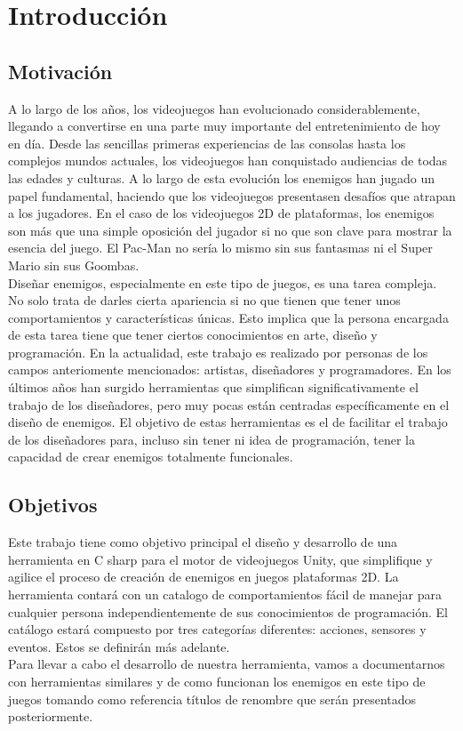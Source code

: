 \chapter{Introducción}
\label{cap:introduccion}


\section{Motivación}
A lo largo de los años, los videojuegos han evolucionado considerablemente, llegando a convertirse en una parte muy importante del entretenimiento de hoy en día. Desde las sencillas primeras experiencias de las consolas hasta los complejos mundos actuales, los videojuegos han conquistado audiencias de todas las edades y culturas. A lo largo de esta evolución los enemigos han jugado un papel fundamental, haciendo que los videojuegos presentasen desafíos que atrapan a los jugadores. 
En el caso de los videojuegos 2D de plataformas, los enemigos son más que una simple oposición del jugador si no que son clave para mostrar la esencia del juego. El Pac-Man no sería lo mismo sin sus fantasmas ni el Super Mario sin sus Goombas. \\
Diseñar enemigos, especialmente en este tipo de juegos, es una tarea compleja. No solo trata de darles cierta apariencia si no que tienen que tener unos comportamientos y características únicas.  Esto implica que la persona encargada de esta tarea tiene que tener ciertos conocimientos en arte, diseño y programación. En la actualidad, este trabajo es realizado por personas de los campos anteriomente mencionados: artistas, diseñadores y programadores.
En los últimos años han surgido herramientas que simplifican significativamente el trabajo de los diseñadores, pero muy pocas están centradas específicamente en el diseño de enemigos. El objetivo de estas herramientas es el de facilitar el trabajo de los diseñadores para, incluso sin tener ni idea de programación, tener la capacidad de crear enemigos totalmente funcionales.


\section{Objetivos}
Este trabajo tiene como objetivo principal el diseño y desarrollo de una herramienta en C sharp para el motor de videojuegos Unity, que simplifique y agilice el proceso de creación de enemigos en juegos plataformas 2D. La herramienta contará con un catalogo de comportamientos fácil de manejar para cualquier persona independientemente de sus conocimientos de programación. El catálogo estará compuesto por tres categorías diferentes: acciones, sensores y eventos. Estos se definirán más adelante. \\
Para llevar a cabo el desarrollo de nuestra herramienta, vamos a documentarnos con herramientas similares y de como funcionan los enemigos en este tipo de juegos tomando como referencia títulos de renombre que serán presentados posteriormente.


